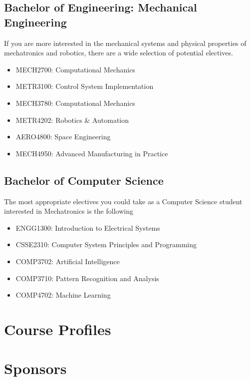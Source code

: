 \documentclass[a4paper,12pt]{report}
\begin{document}
\section{Bachelor of Engineering: Mechanical Engineering}
\vspace*{3mm}
If you are more interested in the mechanical systems and physical properties of mechatronics and robotics, there are a wide selection of potential electives.
\begin{multicols}{2}
    \begin{itemize}
        \item MECH2700: Computational Mechanics
        \item METR3100: Control System Implementation
        \item MECH3780: Computational Mechanics
        \item METR4202: Robotics \& Automation
        \item AERO4800: Space Engineering
        \item MECH4950: Advanced Manufacturing in Practice
    \end{itemize}
\end{multicols}

\newpage

\section{Bachelor of Computer Science}
\vspace*{3mm}
The most appropriate electives you could take as a Computer Science student interested in Mechatronics is the following
\begin{multicols}{2}
    \begin{itemize}
        \item ENGG1300: Introduction to Electrical Systems
        \item CSSE2310: Computer System Principles and Programming
        \item COMP3702: Artificial Intelligence
        \item COMP3710: Pattern Recognition and Analysis
        \item COMP4702: Machine Learning
    \end{itemize}
\end{multicols}


\chapter{Course Profiles}


\chapter{Sponsors} %
\end{document}
